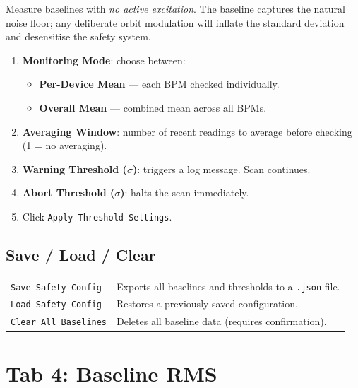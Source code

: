 \documentclass[11pt,a4paper,twoside]{report}
\newcommand{\btn}[1]{\colorbox{accent!12}{\texttt{\small #1}}}
\begin{document}
\begin{warnbox}[Important]
Measure baselines with \emph{no active excitation}. The baseline captures the natural noise floor; any deliberate orbit modulation will inflate the standard deviation and desensitise the safety system.
\end{warnbox}

\begin{stepbox}
\begin{enumerate}
  \item \textbf{Monitoring Mode}: choose between:
    \begin{itemize}
      \item \textbf{Per-Device Mean} --- each BPM checked individually.
      \item \textbf{Overall Mean} --- combined mean across all BPMs.
    \end{itemize}
  \item \textbf{Averaging Window}: number of recent readings to average before checking (1 = no averaging).
  \item \textbf{Warning Threshold ($\sigma$)}: triggers a log message. Scan continues.
  \item \textbf{Abort Threshold ($\sigma$)}: halts the scan immediately.
  \item Click \btn{Apply Threshold Settings}.
\end{enumerate}
\end{stepbox}

\subsection{Save / Load / Clear}

\begin{tabularx}{\textwidth}{lX}
  \toprule
  \btn{Save Safety Config}    & Exports all baselines and thresholds to a \texttt{.json} file. \\
  \btn{Load Safety Config}    & Restores a previously saved configuration. \\
  \btn{Clear All Baselines}   & Deletes all baseline data (requires confirmation). \\
  \bottomrule
\end{tabularx}

\section{Tab 4: Baseline RMS}\label{sec:tab4}
\end{document}
